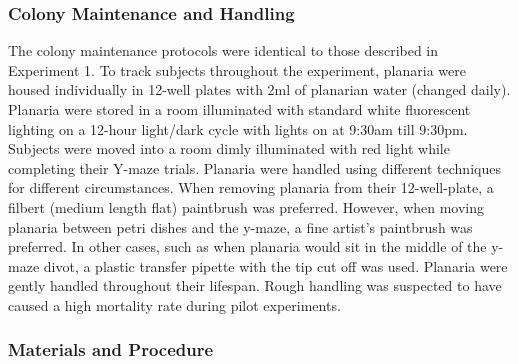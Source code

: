 \documentclass[
  jou,
  floatsintext,
  longtable,
  nolmodern,
  notxfonts,
  notimes,
  donotrepeattitle,
  colorlinks=true,linkcolor=blue,citecolor=blue,urlcolor=blue]{apa7}
\begin{document}
\subsubsection{Colony Maintenance and
Handling}\label{colony-maintenance-and-handling-1}

The colony maintenance protocols were identical to those described in
Experiment 1. To track subjects throughout the experiment, planaria were
housed individually in 12-well plates with 2ml of planarian water
(changed daily). Planaria were stored in a room illuminated
with standard white fluorescent lighting on a 12-hour light/dark cycle
with lights on at 9:30am till 9:30pm. Subjects were moved into a room
dimly illuminated with red light while completing their Y-maze trials.
Planaria were handled using different techniques for different
circumstances. When removing planaria from their 12-well-plate, a
filbert (medium length flat) paintbrush was preferred. However, when
moving planaria between petri dishes and the y-maze, a fine artist's
paintbrush was preferred. In other cases, such as when planaria would
sit in the middle of the y-maze divot, a plastic transfer pipette with
the tip cut off was used. Planaria were gently handled throughout their
lifespan. Rough handling was suspected to have caused a high mortality
rate during pilot experiments.

\subsubsection{Materials and
Procedure}\label{sec-2-materials-and-methods}
\end{document}

